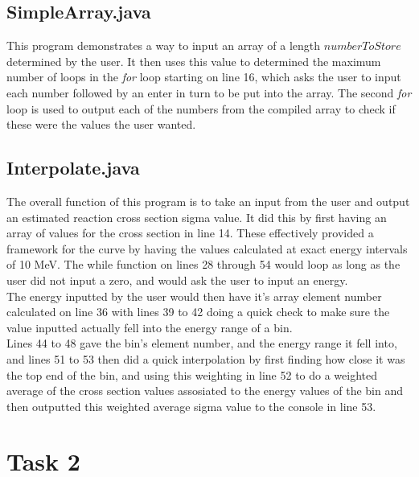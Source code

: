 \documentclass{article}
\begin{document}
\begin{multicols}{2}
		\subsection{SimpleArray.java}
			This program demonstrates a way to input an array of a length $numberToStore$ determined by the user. It then uses this value to determined the maximum number of loops in the \textit{for} loop starting on line 16, which asks the user to input each number followed by an enter in turn to be put into the array. The second \textit{for} loop is used to output each of the numbers from the compiled array to check if these were the values the user wanted.
		\subsection{Interpolate.java}
			The overall function of this program is to take an input from the user and output an estimated reaction cross section sigma value. It did this by first having an array of values for the cross section in line 14. These effectively provided a framework for the curve by having the values calculated at exact energy intervals of 10 MeV. The while function on lines 28 through 54 would loop as long as the user did not input a zero, and would ask the user to input an energy. \\ \indent The energy inputted by the user would then have it's array element number calculated on line 36 with lines 39 to 42 doing a quick check to make sure the value inputted actually fell into the energy range of a bin. \\ \indent Lines 44 to 48 gave the bin's element number, and the energy range it fell into, and lines 51 to 53 then did a quick interpolation by first finding how close it was the top end of the bin, and using this weighting in line 52 to do a weighted average of the cross section values assosiated to the energy values of the bin and then outputted this weighted average sigma value to the console in line 53.
\section{Task 2}

\end{multicols}
\end{document}

